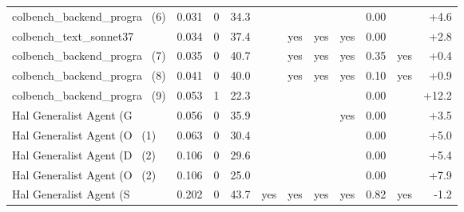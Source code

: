 {\begin{longtable}{lrrrcccccrr}
colbench\_backend\_progra~ (6) & 0.031 & 0 & 34.3 &  &  &  &  & 0.00 &  & +4.6 \\
colbench\_text\_sonnet37 & 0.034 & 0 & 37.4 &  & yes & yes & yes & 0.00 &  & +2.8 \\
colbench\_backend\_progra~ (7) & 0.035 & 0 & 40.7 &  & yes & yes & yes & 0.35 & yes & +0.4 \\
colbench\_backend\_progra~ (8) & 0.041 & 0 & 40.0 &  & yes & yes & yes & 0.10 & yes & +0.9 \\
colbench\_backend\_progra~ (9) & 0.053 & 1 & 22.3 &  &  &  &  & 0.00 &  & +12.2 \\
Hal Generalist Agent (G~ & 0.056 & 0 & 35.9 &  &  &  & yes & 0.00 &  & +3.5 \\
Hal Generalist Agent (O~ (1) & 0.063 & 0 & 30.4 &  &  &  &  & 0.00 &  & +5.0 \\
Hal Generalist Agent (D~ (2) & 0.106 & 0 & 29.6 &  &  &  &  & 0.00 &  & +5.4 \\
Hal Generalist Agent (O~ (2) & 0.106 & 0 & 25.0 &  &  &  &  & 0.00 &  & +7.9 \\
Hal Generalist Agent (S~ & 0.202 & 0 & 43.7 & yes & yes & yes & yes & 0.82 & yes & -1.2 \\
\end{longtable}

}
